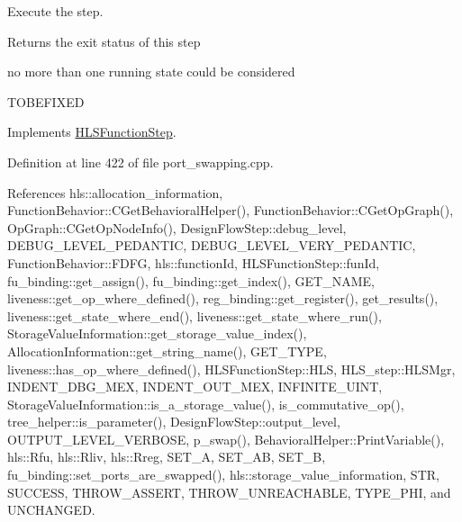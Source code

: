 Execute the step. 

\begin{DoxyReturn}{Returns}
the exit status of this step 
\end{DoxyReturn}
no more than one running state could be considered

T\+O\+B\+E\+F\+I\+X\+ED 

Implements \hyperlink{classHLSFunctionStep_a8db4c00d080655984d98143206fc9fa8}{H\+L\+S\+Function\+Step}.



Definition at line 422 of file port\+\_\+swapping.\+cpp.



References hls\+::allocation\+\_\+information, Function\+Behavior\+::\+C\+Get\+Behavioral\+Helper(), Function\+Behavior\+::\+C\+Get\+Op\+Graph(), Op\+Graph\+::\+C\+Get\+Op\+Node\+Info(), Design\+Flow\+Step\+::debug\+\_\+level, D\+E\+B\+U\+G\+\_\+\+L\+E\+V\+E\+L\+\_\+\+P\+E\+D\+A\+N\+T\+IC, D\+E\+B\+U\+G\+\_\+\+L\+E\+V\+E\+L\+\_\+\+V\+E\+R\+Y\+\_\+\+P\+E\+D\+A\+N\+T\+IC, Function\+Behavior\+::\+F\+D\+FG, hls\+::function\+Id, H\+L\+S\+Function\+Step\+::fun\+Id, fu\+\_\+binding\+::get\+\_\+assign(), fu\+\_\+binding\+::get\+\_\+index(), G\+E\+T\+\_\+\+N\+A\+ME, liveness\+::get\+\_\+op\+\_\+where\+\_\+defined(), reg\+\_\+binding\+::get\+\_\+register(), get\+\_\+results(), liveness\+::get\+\_\+state\+\_\+where\+\_\+end(), liveness\+::get\+\_\+state\+\_\+where\+\_\+run(), Storage\+Value\+Information\+::get\+\_\+storage\+\_\+value\+\_\+index(), Allocation\+Information\+::get\+\_\+string\+\_\+name(), G\+E\+T\+\_\+\+T\+Y\+PE, liveness\+::has\+\_\+op\+\_\+where\+\_\+defined(), H\+L\+S\+Function\+Step\+::\+H\+LS, H\+L\+S\+\_\+step\+::\+H\+L\+S\+Mgr, I\+N\+D\+E\+N\+T\+\_\+\+D\+B\+G\+\_\+\+M\+EX, I\+N\+D\+E\+N\+T\+\_\+\+O\+U\+T\+\_\+\+M\+EX, I\+N\+F\+I\+N\+I\+T\+E\+\_\+\+U\+I\+NT, Storage\+Value\+Information\+::is\+\_\+a\+\_\+storage\+\_\+value(), is\+\_\+commutative\+\_\+op(), tree\+\_\+helper\+::is\+\_\+parameter(), Design\+Flow\+Step\+::output\+\_\+level, O\+U\+T\+P\+U\+T\+\_\+\+L\+E\+V\+E\+L\+\_\+\+V\+E\+R\+B\+O\+SE, p\+\_\+swap(), Behavioral\+Helper\+::\+Print\+Variable(), hls\+::\+Rfu, hls\+::\+Rliv, hls\+::\+Rreg, S\+E\+T\+\_\+A, S\+E\+T\+\_\+\+AB, S\+E\+T\+\_\+B, fu\+\_\+binding\+::set\+\_\+ports\+\_\+are\+\_\+swapped(), hls\+::storage\+\_\+value\+\_\+information, S\+TR, S\+U\+C\+C\+E\+SS, T\+H\+R\+O\+W\+\_\+\+A\+S\+S\+E\+RT, T\+H\+R\+O\+W\+\_\+\+U\+N\+R\+E\+A\+C\+H\+A\+B\+LE, T\+Y\+P\+E\+\_\+\+P\+HI, and U\+N\+C\+H\+A\+N\+G\+ED.

